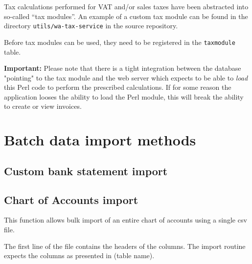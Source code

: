 Tax calculations performed for VAT and/or sales taxes have been abstracted into so-called
``tax modules''.  An example of a custom tax module can be found in the directory
\texttt{utils/wa-tax-service} in the source repository.

Before tax modules can be used, they need to be registered in the \texttt{taxmodule} table.

\textbf{Important:} Please note that there is a tight integration between the database "pointing"
to the tax module and the web server which expects to be able to \textit{load} this Perl code to
perform the prescribed calculations.
If for some reason the application looses the ability to load the Perl module, this will break
the ability to create or view invoices.

\chapter{Batch data import methods}
\label{cha-customization-batch-import}

\section{Custom bank statement import}
\label{sec-customization-batch-import-bank-statement}

\section{Chart of Accounts import}
\label{subsec-customization-import-coa}

This function allows bulk import of an entire chart of accounts using a
single \gls{csv} file.

The first line of the file contains the headers of the columns. The
import routine expects the columns as presented in (table name).

